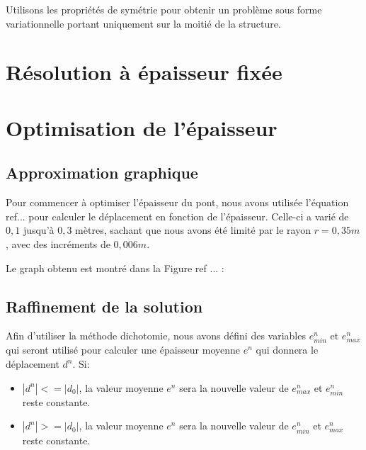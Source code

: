 \documentclass{article}
\begin{document}
    \begin{solution}   
        
    \end{solution}

    \begin{problem}{2}
    Utilisons les propriétés de symétrie pour obtenir un problème sous forme variationnelle portant uniquement sur la moitié de la structure.
    \end{problem}
    
    \begin{solution}   
        
    \end{solution}

    \section{Résolution à épaisseur fixée}
        
    \section{Optimisation de l'épaisseur}

    \subsection{Approximation graphique}
    Pour commencer à optimiser l'épaisseur du pont, nous avons utilisée l'équation ref{...} pour calculer le déplacement en fonction de l'épaisseur. Celle-ci a varié 	de $0,1$ jusqu'à $0,3$ mètres, sachant que nous avons été limité par le rayon $r = 0,35 m$, avec des incréments de $0,006 m$.
    
    Le graph obtenu est montré dans la Figure ref {...} : 
    \subsection{Raffinement de la solution}
    Afin d'utiliser la méthode dichotomie, nous avons défini des variables $e^n_{min}$ et $e^n_{max}$  qui seront utilisé pour calculer une épaisseur moyenne $e^n$ 	qui donnera le déplacement $d^n$. Si:
    
    \begin{itemize}
    \item $|d^n| <= |d_0|$, la valeur moyenne $e^n$ sera la nouvelle valeur de $e^n_{max}$ et $e^n_{min}$ reste constante.
    \item $|d^n| >= |d_0|$, la valeur moyenne $e^n$ sera la nouvelle valeur de $e^n_{min}$ et $e^n_{max}$ reste constante.
    \end{itemize}
   
\end{document}
